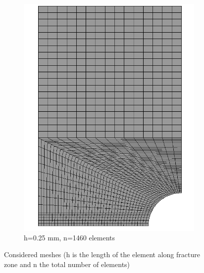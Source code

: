 \documentclass[12pt,twoside]{report}
\begin{document}
\begin{figure}[htbp!]
\begin{subfigure}{0.27\textwidth}
         \includegraphics[width=1.27\textwidth]{25.0.25mm2.png}
         \caption{h=0.25 mm, n=1460 elements}
         \label{fig:0.25mm}
     \end{subfigure}
    \caption{Considered meshes (h is the length of the element along fracture zone and n the total number of elements) }
    \label{fig:Considered meshes}
\end{figure}
\FloatBarrier
\end{document}
